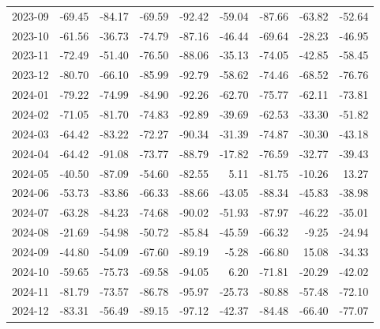 \begin{table}[ht]
\begin{tabular}{lrrrrrrrr}
  2023-09 & -69.45 & -84.17 & -69.59 & -92.42 & -59.04 & -87.66 & -63.82 & -52.64 \\ 
  2023-10 & -61.56 & -36.73 & -74.79 & -87.16 & -46.44 & -69.64 & -28.23 & -46.95 \\ 
  2023-11 & -72.49 & -51.40 & -76.50 & -88.06 & -35.13 & -74.05 & -42.85 & -58.45 \\ 
  2023-12 & -80.70 & -66.10 & -85.99 & -92.79 & -58.62 & -74.46 & -68.52 & -76.76 \\ 
  2024-01 & -79.22 & -74.99 & -84.90 & -92.26 & -62.70 & -75.77 & -62.11 & -73.81 \\ 
  2024-02 & -71.05 & -81.70 & -74.83 & -92.89 & -39.69 & -62.53 & -33.30 & -51.82 \\ 
  2024-03 & -64.42 & -83.22 & -72.27 & -90.34 & -31.39 & -74.87 & -30.30 & -43.18 \\ 
  2024-04 & -64.42 & -91.08 & -73.77 & -88.79 & -17.82 & -76.59 & -32.77 & -39.43 \\ 
  2024-05 & -40.50 & -87.09 & -54.60 & -82.55 & 5.11 & -81.75 & -10.26 & 13.27 \\ 
  2024-06 & -53.73 & -83.86 & -66.33 & -88.66 & -43.05 & -88.34 & -45.83 & -38.98 \\ 
  2024-07 & -63.28 & -84.23 & -74.68 & -90.02 & -51.93 & -87.97 & -46.22 & -35.01 \\ 
  2024-08 & -21.69 & -54.98 & -50.72 & -85.84 & -45.59 & -66.32 & -9.25 & -24.94 \\ 
  2024-09 & -44.80 & -54.09 & -67.60 & -89.19 & -5.28 & -66.80 & 15.08 & -34.33 \\ 
  2024-10 & -59.65 & -75.73 & -69.58 & -94.05 & 6.20 & -71.81 & -20.29 & -42.02 \\ 
  2024-11 & -81.79 & -73.57 & -86.78 & -95.97 & -25.73 & -80.88 & -57.48 & -72.10 \\ 
  2024-12 & -83.31 & -56.49 & -89.15 & -97.12 & -42.37 & -84.48 & -66.40 & -77.07 \\ 
   \hline
\end{tabular}
\end{table}
